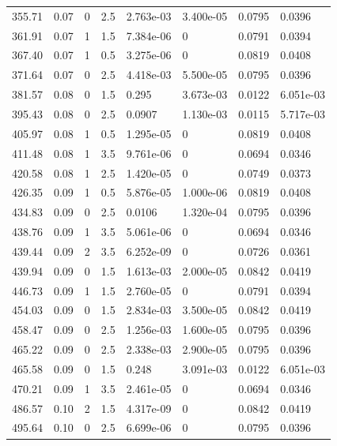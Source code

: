 \documentclass[preview]{standalone}
\begin{document}
{{{\begin{tabular}{L{1.2cm}C{1.2cm} C{0.3cm}C{0.5cm} C{1.4cm}C{1.4cm} C{1.4cm}C{1.4cm}}
  355.71  &  0.07  & 0     & 2.5 &  2.763e-03  & 3.400e-05  & 0.0795 &  0.0396   \\ 
  361.91  &  0.07  & 1     & 1.5 &  7.384e-06  & 0  & 0.0791 &  0.0394   \\ 
  367.40  &  0.07  & 1     & 0.5 &  3.275e-06  & 0  & 0.0819 &  0.0408   \\ 
  371.64  &  0.07  & 0     & 2.5 &  4.418e-03  & 5.500e-05  & 0.0795 &  0.0396   \\ 
  381.57  &  0.08  & 0     & 1.5 &  0.295  & 3.673e-03  & 0.0122 &  6.051e-03   \\ 
  395.43  &  0.08  & 0     & 2.5 &  0.0907  & 1.130e-03  & 0.0115 &  5.717e-03   \\ 
  405.97  &  0.08  & 1     & 0.5 &  1.295e-05  & 0  & 0.0819 &  0.0408   \\ 
  411.48  &  0.08  & 1     & 3.5 &  9.761e-06  & 0  & 0.0694 &  0.0346   \\ 
  420.58  &  0.08  & 1     & 2.5 &  1.420e-05  & 0  & 0.0749 &  0.0373   \\ 
  426.35  &  0.09  & 1     & 0.5 &  5.876e-05  & 1.000e-06  & 0.0819 &  0.0408   \\ 
  434.83  &  0.09  & 0     & 2.5 &  0.0106  & 1.320e-04  & 0.0795 &  0.0396   \\ 
  438.76  &  0.09  & 1     & 3.5 &  5.061e-06  & 0  & 0.0694 &  0.0346   \\ 
  439.44  &  0.09  & 2     & 3.5 &  6.252e-09  & 0  & 0.0726 &  0.0361   \\ 
  439.94  &  0.09  & 0     & 1.5 &  1.613e-03  & 2.000e-05  & 0.0842 &  0.0419   \\ 
  446.73  &  0.09  & 1     & 1.5 &  2.760e-05  & 0  & 0.0791 &  0.0394   \\ 
  454.03  &  0.09  & 0     & 1.5 &  2.834e-03  & 3.500e-05  & 0.0842 &  0.0419   \\ 
  458.47  &  0.09  & 0     & 2.5 &  1.256e-03  & 1.600e-05  & 0.0795 &  0.0396   \\ 
  465.22  &  0.09  & 0     & 2.5 &  2.338e-03  & 2.900e-05  & 0.0795 &  0.0396   \\ 
  465.58  &  0.09  & 0     & 1.5 &  0.248  & 3.091e-03  & 0.0122 &  6.051e-03   \\ 
  470.21  &  0.09  & 1     & 3.5 &  2.461e-05  & 0  & 0.0694 &  0.0346   \\ 
  486.57  &  0.10  & 2     & 1.5 &  4.317e-09  & 0  & 0.0842 &  0.0419   \\ 
  495.64  &  0.10  & 0     & 2.5 &  6.699e-06  & 0  & 0.0795 &  0.0396   \\ 

\end{tabular}}}}
\end{document}
